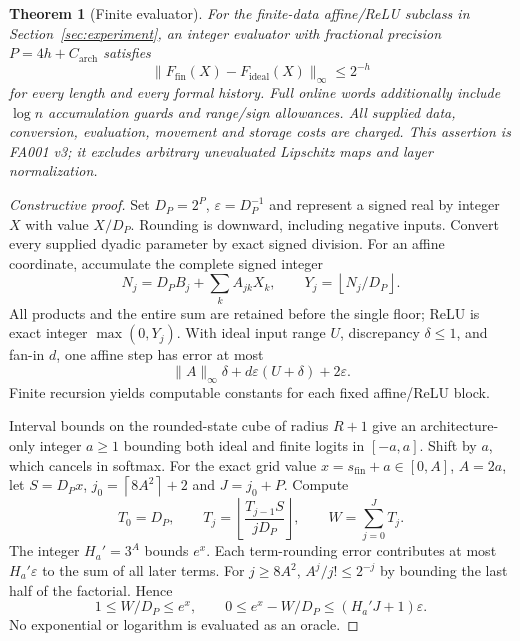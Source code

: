 \documentclass[11pt,letterpaper]{article}
\newtheorem{theorem}{Theorem}[section]
\theoremstyle{definition}\newtheorem{definition}[theorem]{Definition}
\theoremstyle{remark}\newtheorem{remark}[theorem]{Remark}
\newcommand{\floor}[1]{\left\lfloor #1\right\rfloor}
\newcommand{\ceil}[1]{\left\lceil #1\right\rceil}
\newcommand{\unit}[1]{\textsf{#1}}
\begin{document}
\begin{theorem}[Finite evaluator]\label{thm:arithmetic}
For the finite-data affine/ReLU subclass in Section~\ref{sec:experiment}, an integer evaluator with fractional precision $P=4h+C_{\mathrm{arch}}$ satisfies
\[
 \|F_{\mathrm{fin}}(X)-F_{\mathrm{ideal}}(X)\|_\infty\le2^{-h}
\]
for every length and every formal history. Full online words additionally include $\log n$ accumulation guards and range/sign allowances. All supplied data, conversion, evaluation, movement and storage costs are charged. This assertion is \unit{FA001 v3}; it excludes arbitrary unevaluated Lipschitz maps and layer normalization.
\end{theorem}
\begin{proof}[Constructive proof]
Set $D_P=2^P$, $\varepsilon=D_P^{-1}$ and represent a signed real by integer $X$ with value $X/D_P$. Rounding is downward, including negative inputs. Convert every supplied dyadic parameter by exact signed division. For an affine coordinate, accumulate the complete signed integer
\[
 N_j=D_PB_j+\sum_k A_{jk}X_k,\qquad
 Y_j=\floor{N_j/D_P}.
\]
All products and the entire sum are retained before the single floor; ReLU is exact integer $\max(0,Y_j)$. With ideal input range $U$, discrepancy $\delta\le1$, and fan-in $d$, one affine step has error at most
\[
 \|A\|_\infty\delta+d\varepsilon(U+\delta)+2\varepsilon.
\]
Finite recursion yields computable constants for each fixed affine/ReLU block.

Interval bounds on the rounded-state cube of radius $R+1$ give an architecture-only integer $a\ge1$ bounding both ideal and finite logits in $[-a,a]$. Shift by $a$, which cancels in softmax. For the exact grid value $x=s_{\mathrm{fin}}+a\in[0,A]$, $A=2a$, let $S=D_Px$, $j_0=\ceil{8A^2}+2$ and $J=j_0+P$. Compute
\begin{equation}\label{eq:taylor}
 T_0=D_P,\qquad T_j=\floor{\frac{T_{j-1}S}{jD_P}},\qquad
 W=\sum_{j=0}^{J}T_j.
\end{equation}
The integer $H_a'=3^A$ bounds $e^x$. Each term-rounding error contributes at most $H_a'\varepsilon$ to the sum of all later terms. For $j\ge8A^2$, $A^j/j!\le2^{-j}$ by bounding the last half of the factorial. Hence
\begin{equation}\label{eq:exp}
 1\le W/D_P\le e^x,\qquad
 0\le e^x-W/D_P\le(H_a'J+1)\varepsilon.
\end{equation}
No exponential or logarithm is evaluated as an oracle.


\end{proof}
\end{document}
